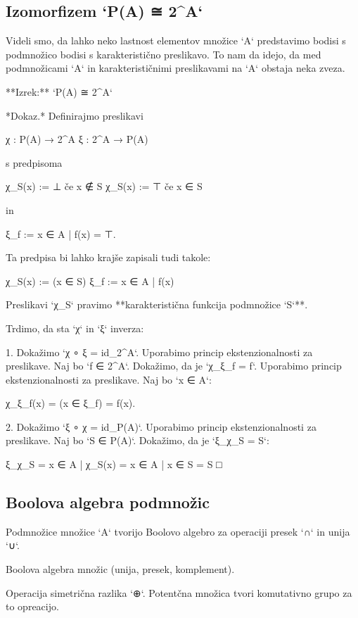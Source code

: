 \subsection{Izomorfizem `P(A) ≅ 2^A`}

Videli smo, da lahko neko lastnost elementov množice `A` predstavimo bodisi s
podmnožico bodisi s karakteristično preslikavo. To nam da idejo, da med
podmnožicami `A` in karakterističnimi preslikavami na `A` obstaja neka zveza.

**Izrek:** `P(A) ≅ 2^A`

*Dokaz.* Definirajmo preslikavi

    χ : P(A) → 2^A
    ξ : 2^A → P(A)

s predpisoma

    χ_S(x) := ⊥ če x ∉ S
    χ_S(x) := ⊤ če x ∈ S

in

    ξ_f := {x ∈ A | f(x) = ⊤}.

Ta predpisa bi lahko krajše zapisali tudi takole:

    χ_S(x) := (x ∈ S)
    ξ_f := {x ∈ A | f(x) }

Preslikavi `χ_S` pravimo **karakteristična funkcija podmnožice `S`**.

Trdimo, da sta `χ` in `ξ` inverza:

1. Dokažimo `χ ∘ ξ = id_{2^A}`. Uporabimo princip ekstenzionalnosti za preslikave.
   Naj bo `f ∈ 2^A`. Dokažimo, da je `χ_{ξ_f} = f`.
   Uporabimo princip ekstenzionalnosti za preslikave. Naj bo `x ∈ A`:

        χ_{ξ_f}(x) = (x ∈ ξ_f) = f(x).

2. Dokažimo `ξ ∘ χ = id_{P(A)}`. Uporabimo princip ekstenzionalnosti za preslikave.
   Naj bo `S ∈ P(A)`. Dokažimo, da je `ξ_{χ_S} = S`:

        ξ_{χ_S} = {x ∈ A | χ_S(x)} = {x ∈ A | x ∈ S} = S             □


\subsection{Boolova algebra podmnožic}

Podmnožice množice `A` tvorijo Boolovo algebro za operaciji presek `∩` in unija `∪`.

Boolova algebra množic (unija, presek, komplement).

Operacija simetrična razlika `⊕`. Potentčna množica tvori komutativno grupo za
to opreacijo.
